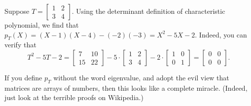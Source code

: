 \begin{example}
	Suppose $T = \begin{bmatrix} 1 & 2 \\ 3 & 4 \end{bmatrix}$.
	Using the determinant definition of characteristic polynomial,
	we find that $p_T(X) = (X-1)(X-4)-(-2)(-3) = X^2 - 5X - 2$.
	Indeed, you can verify that
	\[ T^2 - 5T - 2
		= \begin{bmatrix}
			7 & 10 \\
			15 & 22
		\end{bmatrix}
		- 5 \cdot \begin{bmatrix}
			1 & 2 \\
			3 & 4
		\end{bmatrix}
		- 2 \cdot \begin{bmatrix}
			1 & 0 \\
			0 & 1
		\end{bmatrix}
		= \begin{bmatrix}
			0 & 0 \\
			0 & 0
		\end{bmatrix}.
	\]
\end{example}
If you define $p_T$ without the word eigenvalue,
and adopt the evil view that matrices are arrays of numbers,
then this looks like a complete miracle.
(Indeed, just look at the terrible proofs on Wikipedia.)

